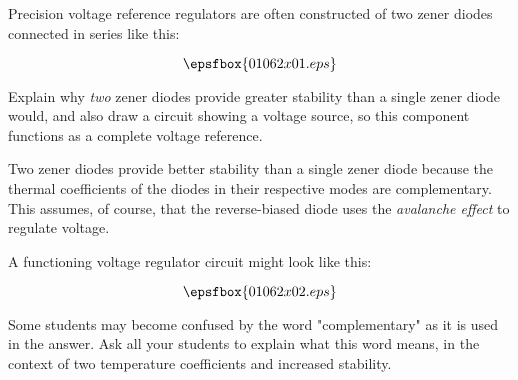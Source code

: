 

Precision voltage reference regulators are often constructed of two zener diodes connected in series like this:

$$\epsfbox{01062x01.eps}$$

Explain why {\it two} zener diodes provide greater stability than a single zener diode would, and also draw a circuit showing a voltage source, so this component functions as a complete voltage reference.







Two zener diodes provide better stability than a single zener diode because the thermal coefficients of the diodes in their respective modes are complementary.  This assumes, of course, that the reverse-biased diode uses the {\it avalanche effect} to regulate voltage.

A functioning voltage regulator circuit might look like this:

$$\epsfbox{01062x02.eps}$$







Some students may become confused by the word "complementary" as it is used in the answer.  Ask all your students to explain what this word means, in the context of two temperature coefficients and increased stability.



